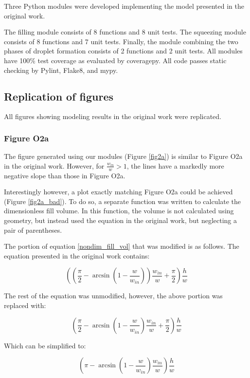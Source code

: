 Three Python modules were developed implementing the model presented in the original work.

The filling module consists of 8 functions and 8 unit tests. The squeezing module consists
of 8 functions and 7 unit tests. Finally, the module combining the two phases of droplet formation
consists of  2 functions and 2 unit tests. All modules have 100\% test coverage as evaluated by
coveragepy. All code passes static checking by Pylint, Flake8, and mypy.

\subsection{Replication of figures}

All figures showing modeling results in the original work were replicated. 

\subsubsection{Figure O2a}

The figure generated using our modules (Figure \ref{fig2a}) is similar to
Figure O2a in the original work. However, for $\frac{w_{in}}{w}>1$, the
lines have a markedly more negative slope than those in Figure O2a.

Interestingly however, a plot exactly matching Figure O2a could be achieved
(Figure \ref{fig2a_bad}). To do so,
a separate function was written to calculate the dimensionless fill volume. In this function,
the volume is not calculated using geometry, but instead used the equation in the original work,
but neglecting a pair of parentheses.

The portion of equation \eqref{nondim_fill_vol} that was modified is as follows.
The equation presented in the original work contains:

$$
\left(\left(\frac{\pi}{2} -
\arcsin\left(1 - \frac{w}{w_{in}}\right)\right)\frac{w_{in}}{w} +
\frac{\pi}{2}\right)\frac{h}{w}
$$

\noindent The rest of the equation was unmodified, however, the above portion was replaced with:

$$
\left(\frac{\pi}{2} -
\arcsin\left(1 - \frac{w}{w_{in}}\right)\frac{w_{in}}{w} +
\frac{\pi}{2}\right)\frac{h}{w}
$$

\noindent Which can be simplified to:

$$
\left(\pi -
\arcsin\left(1 - \frac{w}{w_{in}}\right)\frac{w_{in}}{w}
\right)\frac{h}{w}
$$

